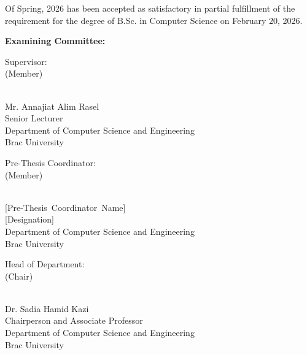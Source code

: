 \documentclass[12pt,a4paper]{report}
\begin{document}
Of Spring, 2026 has been accepted as satisfactory in partial fulfillment of the requirement for the degree of B.Sc. in Computer Science on February 20, 2026.

\vspace{1cm}

\textbf{Examining Committee:}

\vspace{1.5cm}

\begin{flushleft}
Supervisor:\\
(Member)
\end{flushleft}

\begin{flushright}
\vspace{-0.5cm}
\hrulefill\\
Mr. Annajiat Alim Rasel\\
Senior Lecturer\\
Department of Computer Science and Engineering\\
Brac University
\end{flushright}

\vspace{1.5cm}

\begin{flushleft}
Pre-Thesis Coordinator:\\
(Member)
\end{flushleft}

\begin{flushright}
\vspace{-0.5cm}
\hrulefill\\
\mbox{[Pre-Thesis Coordinator Name]}\\
\mbox{[Designation]}\\
Department of Computer Science and Engineering\\
Brac University
\end{flushright}

\vspace{1.5cm}

\begin{flushleft}
Head of Department:\\
(Chair)
\end{flushleft}

\begin{flushright}
\vspace{-0.5cm}
\hrulefill\\
Dr. Sadia Hamid Kazi\\
Chairperson and Associate Professor\\
Department of Computer Science and Engineering\\
Brac University
\end{flushright}
\end{document}
